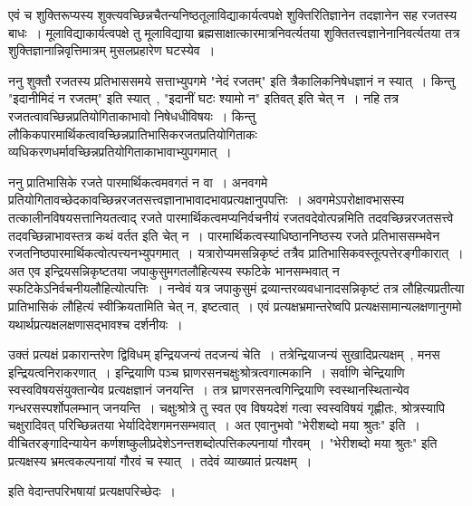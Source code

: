 	एवं च शुक्तिरूप्यस्य शुक्त्यवच्छिन्नचैतन्यनिष्ठतूलाविद्याकार्यत्वपक्षे शुक्तिरितिज्ञानेन तदज्ञानेन सह रजतस्य बाधः~। मूलाविद्याकार्यत्वपक्षे तु मूलाविद्याया ब्रह्मसाक्षात्कारमात्रनिवर्त्यतया शुक्तितत्त्वज्ञानेनानिवर्त्यतया तत्र शुक्तिज्ञानान्निवृत्तिमात्रम् मुसलप्रहारेण घटस्येव~। \par
	ननु शुक्तौ रजतस्य प्रतिभाससमये सत्ताभ्युपगमे "नेदं रजतम्" इति त्रैकालिकनिषेधज्ञानं न स्यात्~। किन्तु "इदानीमिदं न रजतम्" इति स्यात्~, "इदानीं घटः श्यामो न" इतिवत् इति चेत् न~। नहि तत्र रजतत्वावच्छिन्नप्रतियोगिताकाभावो निषेधधीविषयः~। किन्तु लौकिकपारमार्थिकत्वावच्छिन्नप्रातिभासिकरजतप्रतियोगिताकः व्यधिकरणधर्मावच्छिन्नप्रतियोगिताकाभावाभ्युपगमात्~। \par
	ननु प्रातिभासिके रजते पारमार्थिकत्वमवगतं न वा~। अनवगमे प्रतियोगितावच्छेदकावच्छिन्नरजतसत्त्वज्ञानाभावादभावप्रत्यक्षानुपपत्तिः~। अवगमेऽपरोक्षावभासस्य तत्कालीनविषयसत्तानियतत्वाद् रजते पारमार्थिकत्वमप्यनिर्वचनीयं रजतवदेवोत्पन्नमिति तदवच्छिन्नरजतसत्त्वे तदवच्छिन्नाभावस्तत्र कथं वर्तत इति चेत् न~। पारमार्थिकत्वस्याधिष्ठाननिष्ठस्य रजते प्रतिभाससम्भवेन रजतनिष्ठपारमार्थिकत्वोत्पत्त्यनभ्युपगमात्~। यत्रारोप्यमसन्निकृष्टं तत्रैव प्रातिभासिकवस्तूत्पत्तेरङ्गीकारात्~। अत एव इन्द्रियसन्निकृष्टतया जपाकुसुमगतलौहित्यस्य स्फटिके भानसम्भवात् न स्फटिकेऽनिर्वचनीयलौहित्योत्पत्तिः~। नन्वेवं यत्र जपाकुसुमं द्रव्यान्तरव्यवधानादसन्निकृष्टं तत्र लौहित्यप्रतीत्या प्रातिभासिकं लौहित्यं स्वीक्रियतामिति चेत् न, इष्टत्वात्~। एवं प्रत्यक्षभ्रमान्तरेष्वपि प्रत्यक्षसामान्यलक्षणानुगमो यथार्थप्रत्यक्षलक्षणासद्भावश्च दर्शनीयः~।\par
	उक्तं प्रत्यक्षं प्रकारान्तरेण द्विविधम् इन्द्रियजन्यं तदजन्यं चेति~। तत्रेन्द्रियाजन्यं सुखादिप्रत्यक्षम्~, मनस इन्द्रियत्वनिराकरणात्~। इन्द्रियाणि पञ्च घ्राणरसनचक्षुःश्रोत्रत्वगात्मकानि~। सर्वाणि चेन्द्रियाणि स्वस्वविषयसंयुक्तान्येव प्रत्यक्षज्ञानं जनयन्ति~। तत्र घ्राणरसनत्वगिन्द्रियाणि स्वस्थानस्थितान्येव गन्धरसस्पर्शोपलम्भान् जनयन्ति~। चक्षुःश्रोत्रे तु स्वत एव विषयदेशं गत्वा स्वस्वविषयं गृह्णीतः, श्रोत्रस्यापि चक्षुरादिवत् परिच्छिन्नतया भेर्यादिदेशगमनसम्भवात्~। अत एवानुभवो "भेरीशब्दो मया श्रुतः" इति~। वीचितरङ्गादिन्यायेन कर्णशष्कुलीप्रदेशेऽनन्तशब्दोत्पत्तिकल्पनायां गौरवम्~। "भेरीशब्दो मया श्रुतः" इति प्रत्यक्षस्य भ्रमत्वकल्पनायां गौरवं च स्यात्~। तदेवं व्याख्यातं प्रत्यक्षम्~।\\
	\begin{center} इति वेदान्तपरिभषायां प्रत्यक्षपरिच्छेदः~।\end{center} 
